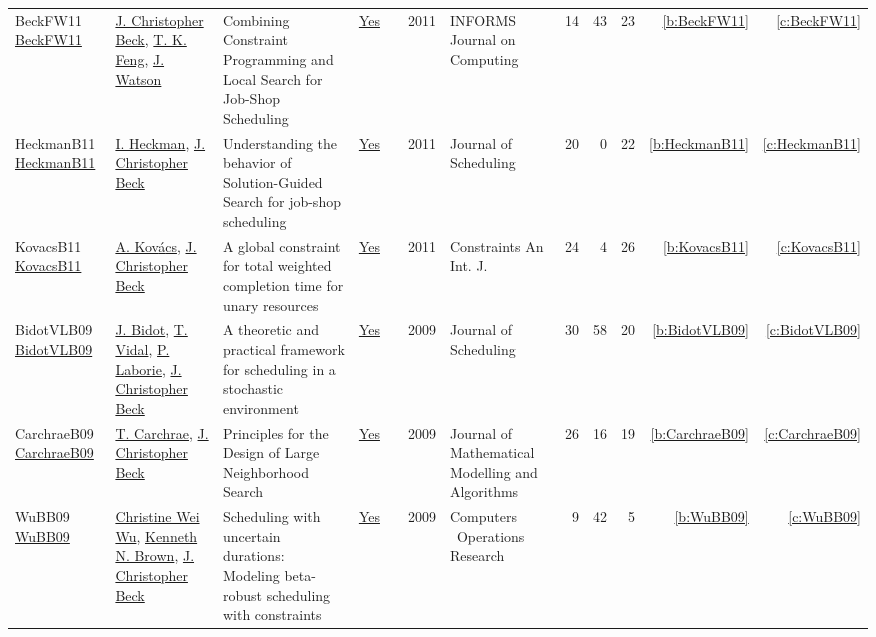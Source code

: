 {\begin{longtable}{>{\raggedright\arraybackslash}p{3cm}>{\raggedright\arraybackslash}p{6cm}>{\raggedright\arraybackslash}p{6.5cm}rrrp{2.5cm}rrrrr}
BeckFW11 \href{https://doi.org/10.1287/ijoc.1100.0388}{BeckFW11} & \hyperref[auth:a89]{J. Christopher Beck}, \hyperref[auth:a834]{T. K. Feng}, \hyperref[auth:a366]{J. Watson} & Combining Constraint Programming and Local Search for Job-Shop Scheduling & \href{../works/BeckFW11.pdf}{Yes} & \cite{BeckFW11} & 2011 & INFORMS Journal on Computing & 14 & 43 & 23 & \ref{b:BeckFW11} & \ref{c:BeckFW11}\\
HeckmanB11 \href{https://doi.org/10.1007/s10951-009-0113-0}{HeckmanB11} & \hyperref[auth:a835]{I. Heckman}, \hyperref[auth:a89]{J. Christopher Beck} & Understanding the behavior of Solution-Guided Search for job-shop scheduling & \href{../works/HeckmanB11.pdf}{Yes} & \cite{HeckmanB11} & 2011 & Journal of Scheduling & 20 & 0 & 22 & \ref{b:HeckmanB11} & \ref{c:HeckmanB11}\\
KovacsB11 \href{https://doi.org/10.1007/s10601-009-9088-x}{KovacsB11} & \hyperref[auth:a147]{A. Kov{\'{a}}cs}, \hyperref[auth:a89]{J. Christopher Beck} & A global constraint for total weighted completion time for unary resources & \href{../works/KovacsB11.pdf}{Yes} & \cite{KovacsB11} & 2011 & Constraints An Int. J. & 24 & 4 & 26 & \ref{b:KovacsB11} & \ref{c:KovacsB11}\\
BidotVLB09 \href{https://doi.org/10.1007/s10951-008-0080-x}{BidotVLB09} & \hyperref[auth:a836]{J. Bidot}, \hyperref[auth:a837]{T. Vidal}, \hyperref[auth:a118]{P. Laborie}, \hyperref[auth:a89]{J. Christopher Beck} & A theoretic and practical framework for scheduling in a stochastic environment & \href{../works/BidotVLB09.pdf}{Yes} & \cite{BidotVLB09} & 2009 & Journal of Scheduling & 30 & 58 & 20 & \ref{b:BidotVLB09} & \ref{c:BidotVLB09}\\
CarchraeB09 \href{http://dx.doi.org/10.1007/s10852-008-9100-2}{CarchraeB09} & \hyperref[auth:a275]{T. Carchrae}, \hyperref[auth:a89]{J. Christopher Beck} & Principles for the Design of Large Neighborhood Search & \href{../works/CarchraeB09.pdf}{Yes} & \cite{CarchraeB09} & 2009 & Journal of Mathematical Modelling and Algorithms & 26 & 16 & 19 & \ref{b:CarchraeB09} & \ref{c:CarchraeB09}\\
WuBB09 \href{https://doi.org/10.1016/j.cor.2008.08.008}{WuBB09} & \hyperref[auth:a277]{Christine Wei Wu}, \hyperref[auth:a223]{Kenneth N. Brown}, \hyperref[auth:a89]{J. Christopher Beck} & Scheduling with uncertain durations: Modeling beta-robust scheduling with constraints & \href{../works/WuBB09.pdf}{Yes} & \cite{WuBB09} & 2009 & Computers \  Operations Research & 9 & 42 & 5 & \ref{b:WuBB09} & \ref{c:WuBB09}\\

\end{longtable}}
